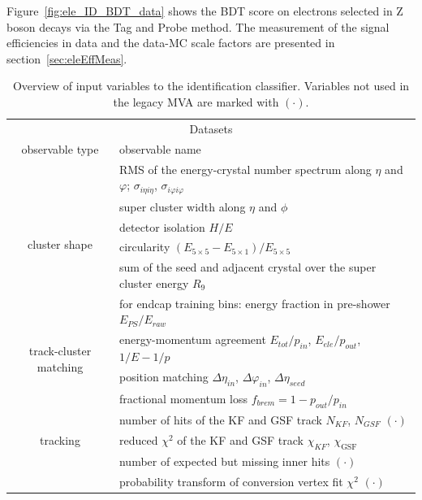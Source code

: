 Figure~\ref{fig:ele_ID_BDT_data} shows the BDT score on electrons selected in Z boson decays via the Tag and Probe method.
The measurement of the signal efficiencies in data and the data-MC scale factors are presented in section~\ref{sec:eleEffMeas}.
 \begin{table}[h]
\scriptsize
    \centering
    \begin{tabular}{c|l}
\hline %
\hline %
\multicolumn{4}{|c|}{Datasets}                                                                \\
observable type    &  observable name           \\
\hline %

\multirow{6}{*}{cluster shape}
        &  RMS of the energy-crystal number spectrum along $\eta$ and $\varphi$; $\sigma_{i\eta i\eta}$, $\sigma_{i\varphi i\varphi}$           \\
        &  super cluster width along $\eta$ and $\phi$          \\
        &  detector isolation $H/E$                     \\
        &  circularity $(E_{5\times5} - E_{5\times1})/E_{5\times5}$                     \\
        &  sum of the seed and adjacent crystal over the super cluster energy $R_{9}$                   \\
        &  for endcap training bins: energy fraction in pre-shower $E_{PS}/E_{raw}$                       \\
\hline
\multirow{2}{*}{track-cluster matching}
        & energy-momentum agreement $E_{tot}/p_{in}$, $E_{ele}/p_{out}$, $1/E - 1/p$                    \\
        & position matching $\Delta\eta_{in}$, $\Delta\varphi_{in}$, $\Delta\eta_{seed}$                        \\
\hline
\multirow{5}{*}{tracking}
        & fractional momentum loss $f_{brem} = 1 - p_{out}/p_{in}$      \\
        & number of hits of the KF and GSF track $N_{KF}$, $N_{GSF}$ $(\mathord{\cdot})$ \\
        & reduced $\chi^2$ of the KF and GSF track $\chi_{KF}$, $\chi_{\textrm{GSF}}$ \\
        & number of expected but missing inner hits $(\mathord{\cdot})$         \\
        & probability transform of conversion vertex fit $\chi^2$ $(\mathord{\cdot})$ \\

\hline %
\hline %
     \end{tabular}
\small
    \caption{Overview of input variables to the identification classifier. Variables not used in the legacy MVA are marked with  $(\mathord{\cdot})$.}
    \label{tab:ele_ID_input_variables}
\end{table}
